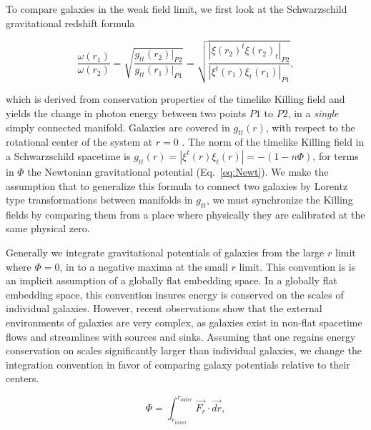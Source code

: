 \documentclass[reprint,%
 amsmath,amssymb,
 aps,
]{revtex4-1}
\begin{document}
 


To compare galaxies in the weak field limit,  we first look at the      Schwarzschild  gravitational redshift formula

\begin{equation}
       \frac{\omega(r_1)}{\omega(r_2)}  =\sqrt{\frac{g_{tt}(r_2)|_{P2}}{g_{tt}(r_1)|_{P1}}} =\sqrt{\frac{|\xi(r_2)^t\xi(r_2)_{t}|_{P2}}{|\xi^t(r_1)\xi_{t}(r_1)|_{P1}}},
      \label{eq:grav}
    \end{equation} 
    
which is derived from conservation properties of the timelike Killing field and 
  yields the change in  photon energy  between two  points $P1$ to $P2$,  in a \emph{single} simply connected   manifold. 
Galaxies are  covered in  $g_{tt}(r)$,   with respect to the rotational center of the system at  
$r=0$  \cite{Wald}. 
 The  norm of the timelike Killing field in  a Schwarzschild spacetime is   $g_{tt}(r)=|\xi^t(r)\xi_{t}(r)|=-(1-n\Phi) $, for terms in    $\Phi$ the Newtonian gravitational potential  (Eq.~\ref{eq:Newt}). 
 We make the assumption that to generalize this formula to connect two galaxies by Lorentz type transformations between manifolds in $g_{tt}$, we must synchronize the Killing fields by comparing them from a place where physically they are calibrated at the same physical zero. 
 


 Generally we integrate  gravitational potentials of galaxies   from the   large $r$ limit where  $\Phi = 0$, in to a negative maxima at the small $r$ limit.
  This   convention is is an implicit assumption of 
  a  globally  flat embedding space.  
  In a globally flat embedding space,  this convention insures      energy is conserved on the scales of individual galaxies. 
  However, recent  observations \cite{Pomarede:2020pme,Hoffman:2017ako}  show that the external environments of galaxies are very complex,  as galaxies exist in  non-flat  spacetime flows and streamlines with sources and sinks. 
  Assuming that one regains  energy conservation  on scales significantly larger than individual galaxies,   we   change the integration    convention  in favor of 
   comparing galaxy potentials relative to  their centers.
 
   
 
   \begin{equation}
     \Phi  =    \int_{r_{inner}}^{r_{outer}} \vec{F_r}\cdot\vec{dr}, 
      \label{eq:Newt2}
      \end{equation}
\end{document}
